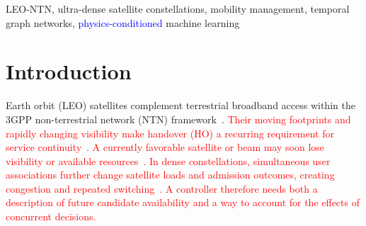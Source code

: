\documentclass[10pt,letterpaper,journal]{IEEEtran}
\newcommand{\revnew}[1]{\textcolor{red}{#1}}
\begin{document}
\maketitle
\begin{abstract}
\revnew{Ultra-dense low-Earth-orbit (LEO) non-terrestrial networks (NTNs) exhibit rapid topology evolution and shared satellite-capacity constraints, making handover (HO) a sequential and risk-sensitive control problem. We propose Cox-PhysiCK, a grey-box HO framework combining a Cox-process feasibility prior with physics-conditioned temporal graph learning. Under locally frozen orbital planes and feasibility retention, the prior yields a mean feasible-entry rate and the probability of no new feasible satellite entry over a look-ahead window. These descriptors condition a kernel bank that models residual multi-user interactions, with bounded message amplitudes under the stated kernel assumptions. Controller evaluations use SGP4-propagated synthetic Walker constellations and a shared physical-link environment. Cox-PhysiCK maintains lower outage and conditional HO-failure levels than the two TGN baselines at the reported settings. At 500 users and 2000 satellites over 200 decision epochs, its unconditional outage probability is $3.051\%$, compared with $4.147\%$ for load-aware greedy, and its mean cost per user--epoch is lower by $0.0356$ with outage weight five. These gains coexist with more frequent switching and higher ping-pong probabilities than load-aware greedy, identifying a weight-dependent trade-off between reliability, switching, and load.}
\end{abstract}

\begin{IEEEkeywords}
LEO-NTN, ultra-dense satellite constellations, mobility management, temporal graph networks, \textcolor{blue}{physics-conditioned} machine learning
\end{IEEEkeywords}

\section{Introduction}
 Earth orbit (LEO) satellites complement terrestrial broadband access within the 3GPP non-terrestrial network (NTN) framework~\cite{3gpp_tr38811,3gpp_tr38821,lin2021_5gfromspace}.
\revnew{Their moving footprints and rapidly changing visibility make handover (HO) a recurring requirement for service continuity~\cite{rinaldi2020_ntn_survey}. A currently favorable satellite or beam may soon lose visibility or available resources~\cite{11112684}. In dense constellations, simultaneous user associations further change satellite loads and admission outcomes, creating congestion and repeated switching~\cite{juan2022_handover,aljeri2022_mobility}. A controller therefore needs both a description of future candidate availability and a way to account for the effects of concurrent decisions.}
\end{document}
